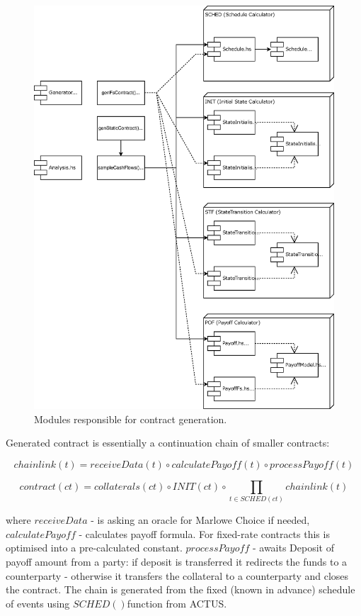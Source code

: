 \documentclass[runningheads]{llncs}
\begin{document}
\begin{figure}
\includegraphics[width=1\textwidth]{images/modules} \caption{Modules responsible for contract generation.}
\label{fig1} 
\end{figure}

Generated contract is essentially a continuation chain of smaller
contracts:

\noindent 
\begin{equation}
chainlink(t)=receiveData(t)\circ calculatePayoff(t)\circ processPayoff(t)
\end{equation}

\noindent 
\begin{equation}
contract(ct)=collaterals(ct)\circ INIT(ct)\circ\prod_{t\in SCHED(ct)}chainlink(t)
\end{equation}

where $receiveData$ - is asking an oracle for Marlowe Choice if needed,
$calculatePayoff$ - calculates payoff formula. For fixed-rate contracts
this is optimised into a pre-calculated constant. $processPayoff$
- awaits Deposit of payoff amount from a party: if deposit is transferred
it redirects the funds to a counterparty - otherwise it transfers
the collateral to a counterparty and closes the contract. The chain
is generated from the fixed (known in advance) schedule of events
using $SCHED()$function from ACTUS.
\end{document}
